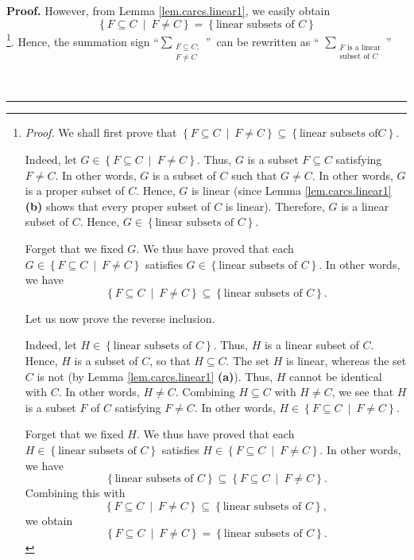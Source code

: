 \documentclass[numbers=enddot,12pt,final,onecolumn,notitlepage]{scrartcl}%
\numberwithin{exer}{section}
\theoremstyle{definition}
\newenvironment{proof}[1][Proof]{\noindent\textbf{#1.} }{\ \rule{0.5em}{0.5em}}
\let\sumnonlimits\sum
\renewcommand{\sum}{\sumnonlimits\limits}
\newenvironment{verlong}{}{}
\begin{document}
\begin{verlong}
\begin{proof}
However, from Lemma \ref{lem.carcs.linear1}, we easily obtain%
\[
\left\{  F\subseteq C\ \mid\ F\neq C\right\}  =\left\{  \text{linear subsets
of }C\right\}
\]
\footnote{\textit{Proof.} We shall first prove that $\left\{  F\subseteq
C\ \mid\ F\neq C\right\}  \subseteq\left\{  \text{linear subsets of
}C\right\}  $.
\par
Indeed, let $G\in\left\{  F\subseteq C\ \mid\ F\neq C\right\}  $. Thus, $G$ is
a subset $F\subseteq C$ satisfying $F\neq C$. In other words, $G$ is a subset
of $C$ such that $G\neq C$. In other words, $G$ is a proper subset of $C$.
Hence, $G$ is linear (since Lemma \ref{lem.carcs.linear1} \textbf{(b)} shows
that every proper subset of $C$ is linear). Therefore, $G$ is a linear subset
of $C$. Hence, $G\in\left\{  \text{linear subsets of }C\right\}  $.
\par
Forget that we fixed $G$. We thus have proved that each $G\in\left\{
F\subseteq C\ \mid\ F\neq C\right\}  $ satisfies $G\in\left\{  \text{linear
subsets of }C\right\}  $. In other words, we have%
\[
\left\{  F\subseteq C\ \mid\ F\neq C\right\}  \subseteq\left\{  \text{linear
subsets of }C\right\}  .
\]
\par
Let us now prove the reverse inclusion.
\par
Indeed, let $H\in\left\{  \text{linear subsets of }C\right\}  $. Thus, $H$ is
a linear subset of $C$. Hence, $H$ is a subset of $C$, so that $H\subseteq C$.
The set $H$ is linear, whereas the set $C$ is not (by Lemma
\ref{lem.carcs.linear1} \textbf{(a)}). Thus, $H$ cannot be identical with $C$.
In other words, $H\neq C$. Combining $H\subseteq C$ with $H\neq C$, we see
that $H$ is a subset $F$ of $C$ satisfying $F\neq C$. In other words,
$H\in\left\{  F\subseteq C\ \mid\ F\neq C\right\}  $.
\par
Forget that we fixed $H$. We thus have proved that each $H\in\left\{
\text{linear subsets of }C\right\}  $ satisfies $H\in\left\{  F\subseteq
C\ \mid\ F\neq C\right\}  $. In other words, we have%
\[
\left\{  \text{linear subsets of }C\right\}  \subseteq\left\{  F\subseteq
C\ \mid\ F\neq C\right\}  .
\]
Combining this with%
\[
\left\{  F\subseteq C\ \mid\ F\neq C\right\}  \subseteq\left\{  \text{linear
subsets of }C\right\}  ,
\]
we obtain
\[
\left\{  F\subseteq C\ \mid\ F\neq C\right\}  =\left\{  \text{linear subsets
of }C\right\}  .
\]
}. Hence, the summation sign \textquotedblleft$\sum_{\substack{F\subseteq
C;\\F\neq C}}$\textquotedblright\ can be rewritten as \textquotedblleft%
$\sum_{\substack{F\text{ is a linear}\\\text{subset of }C}}$\textquotedblright%

\end{proof}
\end{verlong}
\end{document}
